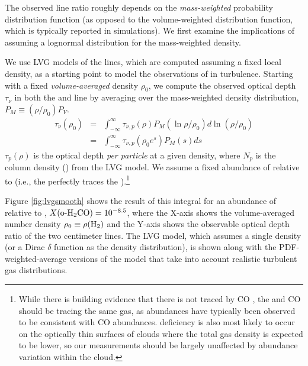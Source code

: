 The observed \formaldehyde line ratio roughly depends on the \emph{mass-weighted}
probability distribution function (as opposed to the volume-weighted
distribution function, which is typically reported in simulations).  We first
examine the implications of assuming a lognormal distribution for the
mass-weighted density.

We use LVG models of the \formaldehyde lines, which are computed assuming a
fixed local density, as a starting point to model the observations of
\formaldehyde in turbulence.   Starting with a fixed \emph{volume-averaged}
density $\rho_0$, we compute the observed \formaldehyde optical depth $\tau_\nu$ in both
the \oneone and \twotwo
line by averaging over the mass-weighted density distribution, $P_M\equiv(\rho/\rho_0) P_V$.
\begin{eqnarray}
    \label{eqn:tauintegral}
    \tau_{\nu}(\rho_0) &=& \int_{-\infty}^\infty \tau_{\nu,p}(\rho) P_M(\ln \rho/\rho_0) d \ln (\rho/\rho_0)\\
                       &=& \int_{-\infty}^\infty \tau_{\nu,p}(\rho_0 e^s) P_M(s) d s
\end{eqnarray} %
$\tau_p(\rho)$ is the optical depth \emph{per particle} at a given density, where $N_p$ is the column
density (\perkmspc) from the LVG model.
We assume a fixed abundance of \ortho relative to \hh
(i.e., the \formaldehyde perfectly traces the \hh).\footnote{While there is
building evidence that there is \hh not traced by CO
\citep{Glover2010a,Shetty2011b,Shetty2011a}, the \formaldehyde and CO should be tracing the
same gas, as \formaldehyde abundances have typically been observed to be
consistent with CO abundances.  \formaldehyde deficiency is also most likely to
occur on the optically thin surfaces of clouds where the total gas density is
expected to be lower, so our measurements should be largely unaffected by
abundance variation within the cloud.}

Figure \ref{fig:lvgsmooth}
shows the result of this integral for an abundance of \ortho relative to \hh, 
$X(\textrm{o-H}_2\textrm{CO})=10^{-8.5}$, where the X-axis shows the volume-averaged number density $\rho_0 \equiv \rho(\textrm{H}_{2})$ and the Y-axis
shows the observable optical depth ratio of the two \formaldehyde centimeter
lines.
The LVG model, which assumes a single density
(or a Dirac $\delta$ function as the density distribution), is shown along with
the PDF-weighted-average versions of the model that take into account realistic turbulent
gas distributions.  

